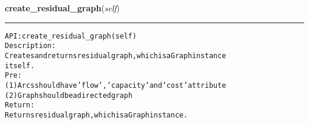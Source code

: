     \label{coinor:gimpy:graph:Graph:create_residual_graph}

    \vspace{0.5ex}

\hspace{.8\funcindent}\begin{boxedminipage}{\funcwidth}

    \raggedright \textbf{create\_residual\_graph}(\textit{self})

    \vspace{-1.5ex}

    \rule{\textwidth}{0.5\fboxrule}
\setlength{\parskip}{2ex}
\begin{alltt}

API: create\_residual\_graph(self)
Description:
Creates and returns residual graph, which is a Graph instance
itself.
Pre:
    (1) Arcs should have 'flow', 'capacity' and 'cost' attribute
    (2) Graph should be a directed graph
Return:
    Returns residual graph, which is a Graph instance.
\end{alltt}

\setlength{\parskip}{1ex}
    \end{boxedminipage}

    \label{coinor:gimpy:graph:Graph:cycle_canceling}

    \vspace{0.5ex}


